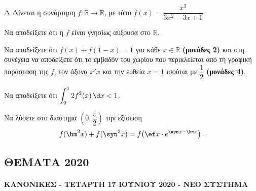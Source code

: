 \begin{thema}{Δ}
Δίνεται η συνάρτηση $f : \mathbb{R} \to \mathbb{R}$, με τύπο $f(x) = \dfrac{x^3}{3x^2 - 3x + 1}$.
\begin{erwthma}
    \item Να αποδείξετε ότι η $f$ είναι γνησίως αύξουσα στο $\mathbb{R}$. 
    \item Να αποδείξετε ότι $f(x) + f(1 - x) = 1$ για κάθε $x \in \mathbb{R}$ \textbf{(μονάδες 2)} και στη συνέχεια να αποδείξετε ότι το εμβαδόν του χωρίου που περικλείεται από τη γραφική παράσταση της $f$, τον άξονα $x'x$ και την ευθεία $x = 1$ ισούται με $\dfrac{1}{2}$ \textbf{(μονάδες 4)}. 
    \item Να αποδείξετε ότι $\displaystyle\int_0^1 2f^2(x)\,\d x < 1$. 
    \item Να λύσετε στο διάστημα $\left(0, \dfrac{\pi}{2}\right)$ την εξίσωση
    \[
    f(\hm^2 x) + f(\syn^2 x) = f\!\left(\ef x \cdot e^{\syn x - \hm x}\right).
    \]
\end{erwthma}
\end{thema}

\subsection{ΘΕΜΑΤΑ 2020}
\paragraph{ΚΑΝΟΝΙΚΕΣ - ΤΕΤΑΡΤΗ 17 ΙΟΥΝΙΟΥ 2020 - ΝΕΟ ΣΥΣΤΗΜΑ}

